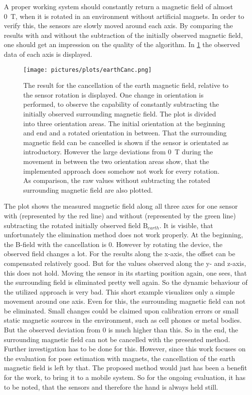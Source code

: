 A proper working system should constantly return a magnetic field of almost \SI{0}{\tesla}, when it is rotated in an environment without artificial magnets. In order to verify this, the sensors are slowly moved around each axis. By comparing the results with and without the subtraction of the initially observed magnetic field, one should get an impression on the quality of the algorithm. In \ref{fig:earthCancelRes} the observed data of each axis is displayed.
\begin{figure}[h]
\centering
\texttt{[image: pictures/plots/earthCanc.png]} 
\caption[Quality of earth cancellation]
{The result for the cancellation of the earth magnetic field, relative to the sensor rotation is displayed. One change in orientation is performed, to observe the capability of constantly subtracting the initially observed surrounding magnetic field. The plot is divided into three orientation areas. The initial orientation at the beginning and end and a rotated orientation in between. That the surrounding magnetic field can be cancelled is shown if the sensor is orientated as introductory. However the large deviations from \SI{0}{\tesla} during the movement in between the two orientation areas show, that the implemented approach does somehow not work for every rotation. As comparison, the raw values without subtracting the rotated surrounding magnetic field are also plotted.}
\label{fig:earthCancelRes}
\end{figure}
The plot shows the measured magnetic field along all three axes for one sensor with (represented by the red line) and without (represented by the green line) subtracting the rotated initially observed field $ \mathrm{B}_{earth} $. It is visible, that unfortunately the elimination method does not work properly. At the beginning, the B-field with the cancellation is 0. However by rotating the device, the observed field changes a lot. For the results along the x-axis, the offset can be compensated relatively good. But for the values observed along the y- and z-axis, this does not hold. Moving the sensor in its starting position again, one sees, that the surrounding field is eliminated pretty well again. So the dynamic behaviour of the utilized approach is very bad. This short example visualizes only a simple movement around one axis. Even for this, the surrounding magnetic field can not be eliminated. Small changes could be claimed upon calibration errors or small static magnetic sources in the environment, such as cell phones or metal bodies. But the observed deviation from 0 is much higher than this. So in the end, the surrounding magnetic field can not be cancelled with the presented method. Further investigation has to be done for this. However, since this work focuses on the evaluation for pose estimation with magnets, the cancellation of the earth magnetic field is left by that. The proposed method would just has been a benefit for the work, to bring it to a mobile system. So for the ongoing evaluation, it has to be noted, that the sensors and therefore the hand is always held still. 


